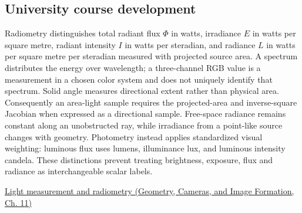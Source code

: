 \subsection{University course development}\label{appendix-215c2570199b-university-course-development}

\hypertarget{appendix-215c2570199b-university-course-development}{}

Radiometry distinguishes total radiant flux \(\Phi\) in watts, irradiance \(E\) in watts per square metre, radiant intensity \(I\) in watts per steradian, and radiance \(L\) in watts per square metre per steradian measured with projected source area. A spectrum distributes the energy over wavelength; a three-channel RGB value is a measurement in a chosen color system and does not uniquely identify that spectrum. Solid angle measures directional extent rather than physical area. Consequently an area-light sample requires the projected-area and inverse-square Jacobian when expressed as a directional sample. Free-space radiance remains constant along an unobstructed ray, while irradiance from a point-like source changes with geometry. Photometry instead applies standardized visual weighting: luminous flux uses lumens, illuminance lux, and luminous intensity candela. These distinctions prevent treating brightness, exposure, flux and radiance as interchangeable scalar labels.

\href{../03-Geometry-Cameras-and-Image-Formation/main.pdf\#nameddest=03-visual-computing-i-ch004-light-measurement-and-radiometry}{Light measurement and radiometry (Geometry, Cameras, and Image Formation, Ch. 11)}
